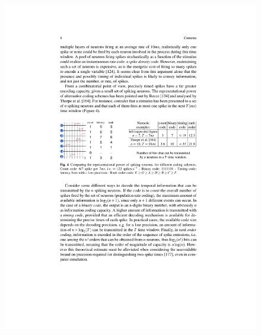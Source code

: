 \documentclass[10pt,aspectratio=43,mathserif, notes]{beamer}
\begin{document}
\begin{frame}
\begin{columns}
\begin{column}{0.5\textwidth}
            \end{column}
            \end{columns}
            \begin{figure}[h]
            \centering
            \includegraphics[width=0.8\linewidth]{image/Coding.pdf}
            \end{figure}
		\end{frame}
\end{document}
